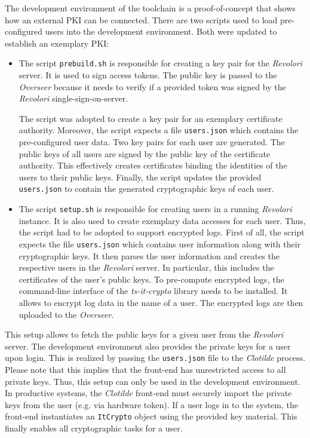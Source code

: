 \documentclass[../main.tex]{subfiles}
\begin{document}
The development environment of the toolchain is a proof-of-concept that shows how an external PKI can be connected.
There are two scripts used to load pre-configured users into the development environment.
Both were updated to establish an exemplary PKI:

\begin{itemize}
    \item 
    The script \verb|prebuild.sh| is responsible for creating a key pair for the \emph{Revolori} server.
    It is used to sign access tokens.
    The public key is passed to the \emph{Overseer} because it needs to verify if a provided token was signed by the \emph{Revolori} single-sign-on-server.
    
    The script was adopted to create a key pair for an exemplary certificate authority.
    Moreover, the script expects a file \verb|users.json| which contains the pre-configured user data.
    Two key pairs for each user are generated.
    The public keys of all users are signed by the public key of the certificate authority.
    This effectively creates certificates binding the identities of the users to their public keys.
    Finally, the script updates the provided \verb|users.json| to contain the generated cryptographic keys of each user.
    \item 
    The script \verb|setup.sh| is responsible for creating users in a running \emph{Revolori} instance.
    It is also used to create exemplary data accesses for each user.
    Thus, the script had to be adopted to support encrypted logs.
    First of all, the script expects the file \verb|users.json| which contains user information along with their cryptographic keys.
    It then parses the user information and creates the respective users in the \emph{Revolori} server.
    In particular, this includes the certificates of the user's public keys.
    To pre-compute encrypted logs, the command-line interface of the \emph{ts-it-crypto} library needs to be installed.
    It allows to encrypt log data in the name of a user.
    The encrypted logs are then uploaded to the \emph{Overseer}.
\end{itemize}

This setup allows to fetch the public keys for a given user from the \emph{Revolori} server.
The development environment also provides the private keys for a user upon login.
This is realized by passing the \verb|users.json| file to the \emph{Clotilde} process.
Please note that this implies that the front-end has unrestricted access to all private keys.
Thus, this setup can only be used in the development environment.
In productive systems, the \emph{Clotilde} front-end must securely import the private keys from the user (e.g. via hardware token).
If a user logs in to the system, the front-end instantiates an \verb|ItCrypto| object using the provided key material.
This finally enables all cryptographic tasks for a user.
\end{document}
